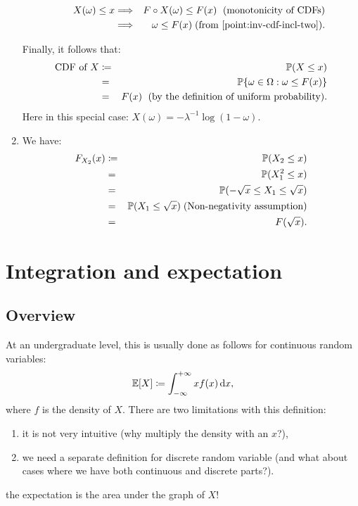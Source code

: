 \documentclass{article}
\begin{document}
\begin{enumerate}
\begin{itemize}
\begin{eqnarray*}
	X(\omega) \le x &\Longrightarrow& F\circ X(\omega)  \le F(x)\;\text{ (monotonicity of CDFs)} \\
	&\Longrightarrow& \omega \le F(x)\;\text{(from \ref{point:inv-cdf-incl-two}).}
	\end{eqnarray*}
	\end{itemize}
	Finally, it follows that:
	\begin{eqnarray*}
	\text{CDF of }X &\coloneqq& {\mathbb P}(X \le x) \\
	&=& {\mathbb P}\{\omega \in \Omega : \omega \le F(x) \} \\
	&=& F(x) \;\text{ (by the definition of uniform probability).}
	\end{eqnarray*}
	Here in this special case: $X(\omega) = - \lambda^{-1} \log(1 - \omega)$.
	\item We have:
	\begin{eqnarray*}
	F_{X_2}(x) &\coloneqq& {\mathbb P}(X_2 \le x) \\
	&=& {\mathbb P}(X_1^2 \le x) \\
	&=& {\mathbb P}(-\sqrt{x} \le X_1 \le \sqrt{x}) \\
	&=& {\mathbb P}(X_1 \le \sqrt{x}) \;\text{(Non-negativity assumption)} \\
	&=& F(\sqrt{x}).
	\end{eqnarray*}
\end{enumerate}


\section{Integration and expectation} 

\subsection{Overview}

 At an undergraduate level, this is usually done as follows for continuous random variables:
\[ {\mathbb E}[X] \coloneqq \int_{-\infty}^{+\infty} x f(x) \,\mathrm{d} x, \]
where $f$ is the density of $X$. There are two limitations with this definition:
\begin{enumerate}
  \item it is not very intuitive (why multiply the density with an $x$?),
  \item we need a separate definition for discrete random variable (and what about cases where we have both continuous and discrete parts?).
\end{enumerate}

 the expectation is the area under the graph of $X$!
\end{document}

